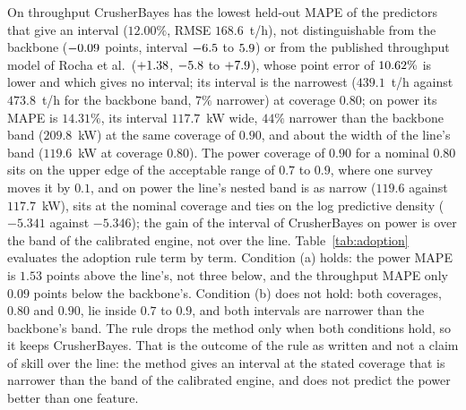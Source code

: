 On throughput CrusherBayes has the lowest held-out MAPE of the predictors that give an interval ($12.00\%$, RMSE $168.6$~t/h), not
distinguishable from the backbone ($-0.09$ points, interval $-6.5$ to $5.9$) or from the published throughput model of Rocha et
al.\ ($+1.38$, $-5.8$ to $+7.9$), whose point error of $10.62\%$ is lower and which gives no interval; its interval
is the narrowest ($439.1$~t/h against $473.8$~t/h for the backbone band, $7\%$ narrower) at coverage $0.80$; on power its MAPE is $14.31\%$, its interval $117.7$~kW wide, $44\%$ narrower than the backbone
band ($209.8$~kW) at the same coverage of $0.90$, and about the width of the line's band ($119.6$~kW at coverage $0.80$). The power coverage of $0.90$ for a nominal $0.80$ sits on the upper
edge of the acceptable range of $0.7$ to $0.9$, where one survey moves it by $0.1$, and on power the line's nested band is as narrow
($119.6$ against $117.7$~kW), sits at the nominal coverage and ties on the log predictive density ($-5.341$ against $-5.346$); the gain of the
interval of CrusherBayes on power is over the band of the calibrated engine, not over the line. Table~\ref{tab:adoption}
evaluates the adoption rule term by term. Condition (a) holds: the power MAPE is $1.53$ points above the line's, not three below, and the throughput
MAPE only $0.09$ points below the backbone's. Condition (b) does not hold: both coverages, $0.80$ and $0.90$, lie inside $0.7$ to $0.9$, and both intervals
are narrower than the backbone's band. The rule drops the method only when both conditions hold, so it keeps CrusherBayes. That is the outcome of the
rule as written and not a claim of skill over the line: the method gives an interval at the stated coverage that is narrower than the band of the
calibrated engine, and does not predict the power better than one feature.

\begin{table}[!t]
\centering
\caption{The adoption rule of CrusherBayes evaluated term by term on the held-out scores: the value of CrusherBayes, the reference predictor's value, the
difference, the condition stated before the run and whether CrusherBayes meets it. Generated from \texttt{crusherbayes.json}.}
\label{tab:adoption}
\footnotesize

\end{table}


